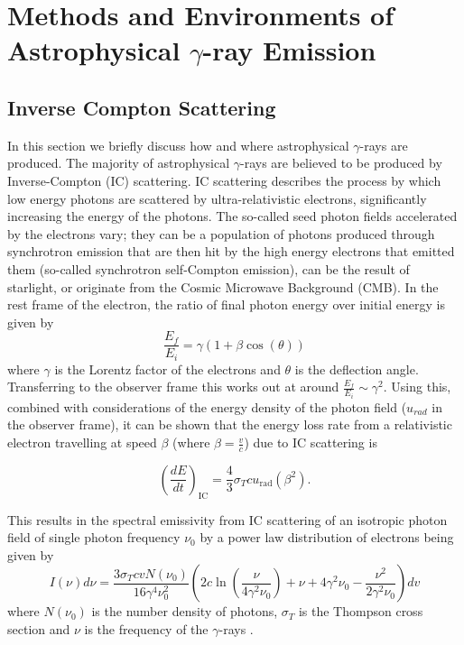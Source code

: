 \section{Methods and Environments of Astrophysical \ensuremath{\gamma}-ray Emission}
\subsection{Inverse Compton Scattering}

In this section we briefly discuss how and where astrophysical $\gamma$-rays are produced. The majority of astrophysical $\gamma$-rays are believed to be produced by Inverse-Compton (IC) scattering. IC scattering describes the process by which low energy photons are scattered by ultra-relativistic electrons, significantly increasing the energy of the photons. The so-called seed photon fields accelerated by the electrons vary; they can be a population of photons produced through synchrotron emission that are then hit by the high energy electrons that emitted them (so-called synchrotron self-Compton emission), can be the result of starlight, or originate from the Cosmic Microwave Background (CMB). In the rest frame of the electron, the ratio of final photon energy over initial energy is given by
\begin{equation}
    \frac{E_f}{E_i}=\gamma (1+\beta \cos(\theta))
\end{equation}
where $\gamma$ is the Lorentz factor of the electrons and $\theta$ is the deflection angle. Transferring to the observer frame this works out at around $\frac{E_f}{E_i}\sim \gamma^2$. Using this, combined with considerations of the energy density of the photon field ($u_{rad}$ in the observer frame), it can be shown \cite{longair} that the energy loss rate from a relativistic electron travelling at speed $\beta$ (where $\beta=\frac{v}{c}$) due to IC scattering is

\begin{equation}
    \left(\frac{dE}{dt}\right)_{\mathrm{IC}}=\frac{4}{3}\sigma_T c u_{\mathrm{rad}}\left(\beta^2\right).
\end{equation}

This results in the spectral emissivity from IC scattering of an isotropic photon field of single photon frequency $\nu_0$ by a power law distribution of electrons being given by 
\begin{equation}
    I(\nu)d\nu=\frac{3\sigma_TcvN(\nu_0)}{16\gamma^4\nu_0^2}\left(2c\ln\left(\frac{\nu}{4\gamma^2\nu_0}\right)+\nu+4\gamma^2\nu_0-\frac{\nu^2}{2\gamma^2\nu_0}\right)dv
    \label{eq:powerlaw}
\end{equation}
where $N(\nu_0)$ is the number density of photons, $\sigma_T$ is the Thompson cross section and $\nu$ is the frequency of the $\gamma$-rays \cite{blumenthal}.

